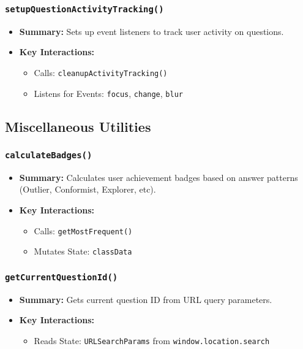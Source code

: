\documentclass[11pt,letterpaper]{article}
\begin{document}
\subsubsection{\texttt{setupQuestionActivityTracking()}}
\begin{itemize}
    \item \textbf{Summary:} Sets up event listeners to track user activity on questions.
    \item \textbf{Key Interactions:}
    \begin{itemize}
        \item Calls: \texttt{cleanupActivityTracking()}
        \item Listens for Events: \texttt{focus}, \texttt{change}, \texttt{blur}
    \end{itemize}
\end{itemize}

\subsection{Miscellaneous Utilities}

\subsubsection{\texttt{calculateBadges()}}
\begin{itemize}
    \item \textbf{Summary:} Calculates user achievement badges based on answer patterns (Outlier, Conformist, Explorer, etc).
    \item \textbf{Key Interactions:}
    \begin{itemize}
        \item Calls: \texttt{getMostFrequent()}
        \item Mutates State: \texttt{classData}
    \end{itemize}
\end{itemize}

\subsubsection{\texttt{getCurrentQuestionId()}}
\begin{itemize}
    \item \textbf{Summary:} Gets current question ID from URL query parameters.
    \item \textbf{Key Interactions:}
    \begin{itemize}
        \item Reads State: \texttt{URLSearchParams} from \texttt{window.location.search}
    \end{itemize}
\end{itemize}
\end{document}
